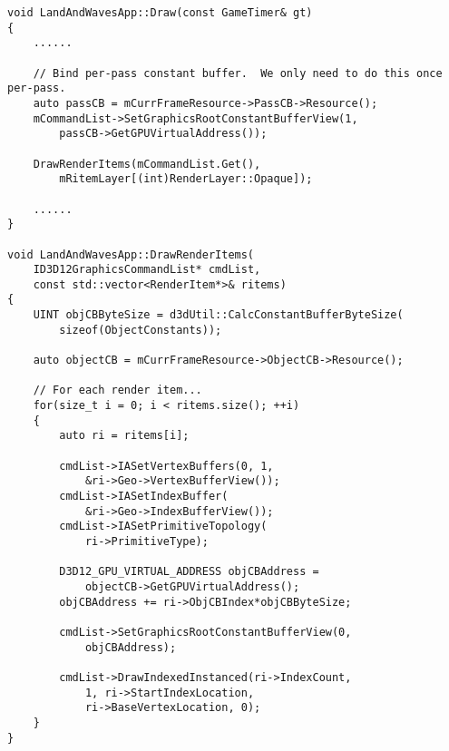\begin{lstlisting}
void LandAndWavesApp::Draw(const GameTimer& gt)
{
    ......

    // Bind per-pass constant buffer.  We only need to do this once per-pass.
    auto passCB = mCurrFrameResource->PassCB->Resource();
    mCommandList->SetGraphicsRootConstantBufferView(1, 
        passCB->GetGPUVirtualAddress());

    DrawRenderItems(mCommandList.Get(), 
        mRitemLayer[(int)RenderLayer::Opaque]);

    ......
}

void LandAndWavesApp::DrawRenderItems(
    ID3D12GraphicsCommandList* cmdList, 
    const std::vector<RenderItem*>& ritems)
{
    UINT objCBByteSize = d3dUtil::CalcConstantBufferByteSize(
        sizeof(ObjectConstants));

    auto objectCB = mCurrFrameResource->ObjectCB->Resource();

    // For each render item...
    for(size_t i = 0; i < ritems.size(); ++i)
    {
        auto ri = ritems[i];

        cmdList->IASetVertexBuffers(0, 1, 
            &ri->Geo->VertexBufferView());
        cmdList->IASetIndexBuffer(
            &ri->Geo->IndexBufferView());
        cmdList->IASetPrimitiveTopology(
            ri->PrimitiveType);

        D3D12_GPU_VIRTUAL_ADDRESS objCBAddress = 
            objectCB->GetGPUVirtualAddress();
        objCBAddress += ri->ObjCBIndex*objCBByteSize;

        cmdList->SetGraphicsRootConstantBufferView(0, 
            objCBAddress);

        cmdList->DrawIndexedInstanced(ri->IndexCount, 
            1, ri->StartIndexLocation, 
            ri->BaseVertexLocation, 0);
    }
}
\end{lstlisting}



